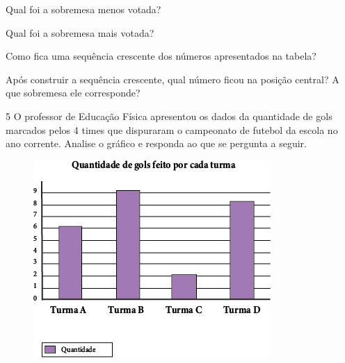 \begin{escolha}
\item
  Qual foi a sobremesa menos votada?


\item
  Qual foi a sobremesa mais votada?


\item
  Como fica uma sequência crescente dos números apresentados na tabela?


\item
  Após construir a sequência crescente, qual número ficou na posição
  central? A que sobremesa ele corresponde?

\end{escolha}

\num{5} O professor de Educação Física apresentou os dados da quantidade de gols
marcados pelos 4 times que dispuraram o campeonato de futebol da escola no ano
corrente. Analise o gráfico e responda ao que se pergunta a seguir.

\begin{figure}[htpb!]
\centering
\includegraphics[width=.85\textwidth]{media/image44.png}
\end{figure}

